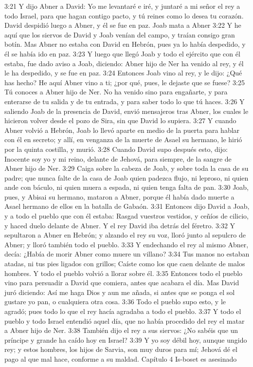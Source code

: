 3:21 Y dijo Abner a David: Yo me levantaré e iré, y juntaré a mi señor el rey a todo Israel, para que hagan contigo pacto, y tú reines como lo desea tu corazón. David despidió luego a Abner, y él se fue en paz.  
Joab mata a Abner  
3:22 Y he aquí que los siervos de David y Joab venían del campo, y traían consigo gran botín. Mas Abner no estaba con David en Hebrón, pues ya lo había despedido, y él se había ido en paz.  
3:23 Y luego que llegó Joab y todo el ejército que con él estaba, fue dado aviso a Joab, diciendo: Abner hijo de Ner ha venido al rey, y él le ha despedido, y se fue en paz.  
3:24 Entonces Joab vino al rey, y le dijo: ¿Qué has hecho? He aquí Abner vino a ti; ¿por qué, pues, le dejaste que se fuese?  
3:25 Tú conoces a Abner hijo de Ner. No ha venido sino para engañarte, y para enterarse de tu salida y de tu entrada, y para saber todo lo que tú haces.  
3:26 Y saliendo Joab de la presencia de David, envió mensajeros tras Abner, los cuales le hicieron volver desde el pozo de Sira, sin que David lo supiera.  
3:27 Y cuando Abner volvió a Hebrón, Joab lo llevó aparte en medio de la puerta para hablar con él en secreto; y allí, en venganza de la muerte de Asael su hermano, le hirió por la quinta costilla, y murió.  
3:28 Cuando David supo después esto, dijo: Inocente soy yo y mi reino, delante de Jehová, para siempre, de la sangre de Abner hijo de Ner.  
3:29 Caiga sobre la cabeza de Joab, y sobre toda la casa de su padre; que nunca falte de la casa de Joab quien padezca flujo, ni leproso, ni quien ande con báculo, ni quien muera a espada, ni quien tenga falta de pan.  
3:30 Joab, pues, y Abisai su hermano, mataron a Abner, porque él había dado muerte a Asael hermano de ellos en la batalla de Gabaón.  
3:31 Entonces dijo David a Joab, y a todo el pueblo que con él estaba: Rasgad vuestros vestidos, y ceñíos de cilicio, y haced duelo delante de Abner. Y el rey David iba detrás del féretro.  
3:32 Y sepultaron a Abner en Hebrón; y alzando el rey su voz, lloró junto al sepulcro de Abner; y lloró también todo el pueblo. 
3:33 Y endechando el rey al mismo Abner, decía:  
¿Había de morir Abner como muere un villano?  
3:34 Tus manos no estaban atadas, ni tus pies ligados con grillos;  
Caíste como los que caen delante de malos hombres.  
Y todo el pueblo volvió a llorar sobre él.  
3:35 Entonces todo el pueblo vino para persuadir a David que comiera, antes que acabara el día. Mas David juró diciendo: Así me haga Dios y aun me añada, si antes que se ponga el sol gustare yo pan, o cualquiera otra cosa.  
3:36 Todo el pueblo supo esto, y le agradó; pues todo lo que el rey hacía agradaba a todo el pueblo. 
3:37 Y todo el pueblo y todo Israel entendió aquel día, que no había procedido del rey el matar a Abner hijo de Ner.  
3:38 También dijo el rey a sus siervos: ¿No sabéis que un príncipe y grande ha caído hoy en Israel?  
3:39 Y yo soy débil hoy, aunque ungido rey; y estos hombres, los hijos de Sarvia, 
son muy duros para mí; Jehová dé el pago al que mal hace, conforme a su maldad.  
Capítulo 4 
Is-boset es asesinado  

